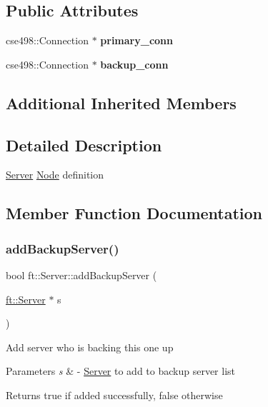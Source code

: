 \subsection*{Public Attributes}
\begin{DoxyCompactItemize}
\item 
\mbox{\label{classft_1_1Server_abd5204ed28334489e0358975cd3e9f34}} 
cse498\+::\+Connection $\ast$ {\bfseries primary\+\_\+conn}
\item 
\mbox{\label{classft_1_1Server_ac99b52438e80a92645fcc6b6c57e2f6b}} 
cse498\+::\+Connection $\ast$ {\bfseries backup\+\_\+conn}
\end{DoxyCompactItemize}
\subsection*{Additional Inherited Members}


\subsection{Detailed Description}
\mbox{\hyperlink{classft_1_1Server}{Server}} \mbox{\hyperlink{classft_1_1Node}{Node}} definition 

\subsection{Member Function Documentation}
\mbox{\label{classft_1_1Server_a2458eef12718b2f04129a68ddea466c3}} 
\subsubsection{\texorpdfstring{add\+Backup\+Server()}{addBackupServer()}}
{\footnotesize\ttfamily bool ft\+::\+Server\+::add\+Backup\+Server (\begin{DoxyParamCaption}\item[{\mbox{\hyperlink{classft_1_1Server}{ft\+::\+Server}} $\ast$}]{s }\end{DoxyParamCaption})}

Add server who is backing this one up


\begin{DoxyParams}{Parameters}
{\em s} & -\/ \mbox{\hyperlink{classft_1_1Server}{Server}} to add to backup server list\\
\hline
\end{DoxyParams}
\begin{DoxyReturn}{Returns}
true if added successfully, false otherwise 
\end{DoxyReturn}
\mbox{\label{classft_1_1Server_a5f5dd98bd5956bb480f4e8564c7620cd}} 
